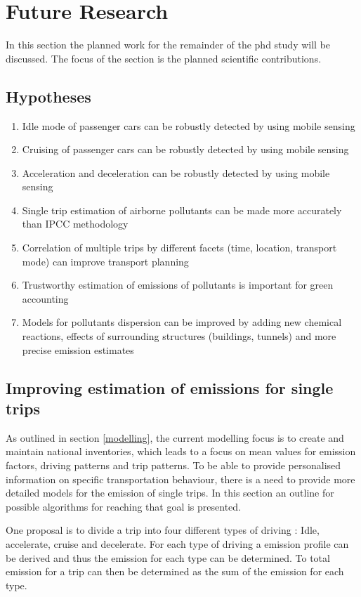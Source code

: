 \section{Future Research}\label{futurework}
In this section the planned work for the remainder of the phd study will be discussed. The focus of the section is the planned scientific contributions.

\subsection{Hypotheses}
\begin{enumerate}
	\item{Idle mode of passenger cars can be robustly detected by using mobile sensing}
	\item{Cruising of passenger cars can be robustly detected by using mobile sensing}
	\item{Acceleration and deceleration can be robustly detected by using mobile sensing}
	\item{Single trip estimation of airborne pollutants can be made more accurately than IPCC methodology}
	\item{Correlation of multiple trips by different facets (time, location, transport mode) can improve transport planning}
	\item{Trustworthy estimation of emissions of pollutants is important for green accounting}
	\item{Models for pollutants dispersion can be improved by adding new chemical reactions, effects of surrounding structures (buildings, tunnels) and more precise emission estimates}
\end{enumerate}
\subsection{Improving estimation of emissions for single trips}
As outlined in section \ref{modelling}, the current modelling focus is to create and maintain national inventories, which leads to a focus on mean values for emission factors, driving patterns and trip patterns. To be able to provide personalised information on specific transportation behaviour, there is a need to provide more detailed models for the emission of single trips. In this section an outline for possible algorithms for reaching that goal is presented.

One proposal is to divide a trip into four different types of driving : Idle, accelerate, cruise and decelerate. For each type of driving a emission profile can be derived and thus the emission for each type can be determined. To total emission for a trip can then be determined as the sum of the emission for each type.

